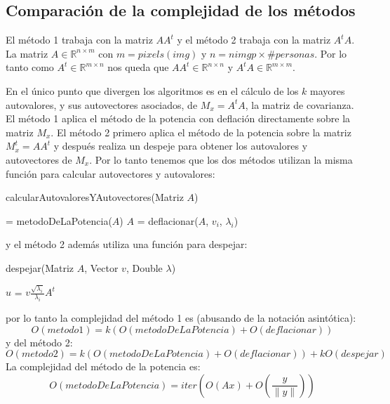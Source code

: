 \subsection{Comparación de la complejidad de los métodos}
El método 1 trabaja con la matriz $AA^t$ y el método 2 trabaja con la matriz $A^tA$.
La matriz $A\in\mathbb{R}^{n \times m}$ con $m = pixels(img)$ y $n = nimgp \times \#personas$. Por lo tanto como $A^t\in\mathbb{R}^{m \times n}$ nos
queda que $AA^t\in\mathbb{R}^{n \times n}$ y $A^tA\in\mathbb{R}^{m \times m}$.

En el \'unico punto que divergen los algoritmos es en el c\'alculo de los $k$ mayores autovalores, y sus
autovectores asociados, de $M_x = A^tA$, la matriz de covarianza. 
El m\'etodo 1 aplica el m\'etodo de la potencia con deflaci\'on directamente sobre la matriz $M_x$. 
El m\'etodo 2 primero aplica el m\'etodo de la potencia sobre la matriz $M^t_x = AA^t$ y después realiza un despeje para obtener los 
autovalores y autovectores de $M_x$. 
Por lo tanto tenemos que los dos métodos utilizan la misma función para calcular autovectores y autovalores:
\newpage
\begin{algorithm}
\caption{calcularAutovaloresYAutovectores(Matriz $A$)}
\label{pseudo:calcularAutovaloresYAutovectores}
\begin{algorithmic}
  \STATE [$v_i$, $\lambda_i$] = metodoDeLaPotencia($A$)
  \STATE $A$ = deflacionar($A$, $v_i$, $\lambda_i$)
\ENDFOR
\end{algorithmic}
\end{algorithm}
y el método 2 además utiliza una función para despejar:
\begin{algorithm}
\caption{despejar(Matriz $A$, Vector $v$, Double $\lambda$)}
\label{pseudo:despejar}
\begin{algorithmic}
  \STATE $u$ = $v\frac{ \sqrt{\lambda_{i} } }{ \lambda_{i} }  A^{t}$   
\end{algorithmic}
\end{algorithm}
por lo tanto la complejidad del método 1 es (abusando de la notación asintótica):
\begin{displaymath}
  O(metodo1) = k (O(metodoDeLaPotencia) + O(deflacionar))
\end{displaymath}
y del método 2:
\begin{displaymath}
  O(metodo2) = k (O(metodoDeLaPotencia) + O(deflacionar)) + k O(despejar)
\end{displaymath}
La complejidad del método de la potencia es:
\begin{displaymath}
  O(metodoDeLaPotencia) = iter (O(Ax) + O(\frac{y}{{\parallel}y{\parallel}}))
\end{displaymath}
